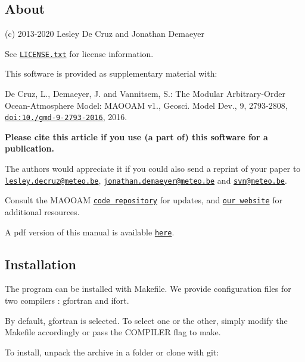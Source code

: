 \subsection*{About}

(c) 2013-\/2020 Lesley De Cruz and Jonathan Demaeyer

See \href{../../LICENSE.txt}{\tt L\+I\+C\+E\+N\+S\+E.\+txt} for license information.

This software is provided as supplementary material with\+:


\begin{DoxyItemize}
\item De Cruz, L., Demaeyer, J. and Vannitsem, S.\+: The Modular Arbitrary-\/\+Order Ocean-\/\+Atmosphere Model\+: M\+A\+O\+O\+AM v1., Geosci. Model Dev., 9, 2793-\/2808, \href{http://dx.doi.org/10.5194/gmd-9-2793-2016}{\tt doi\+:10./gmd-\/9-\/2793-\/2016}, 2016.
\end{DoxyItemize}

{\bfseries Please cite this article if you use (a part of) this software for a publication.}

The authors would appreciate it if you could also send a reprint of your paper to \href{mailto:lesley.decruz@meteo.be}{\tt lesley.\+decruz@meteo.\+be}, \href{mailto:jonathan.demaeyer@meteo.be}{\tt jonathan.\+demaeyer@meteo.\+be} and \href{mailto:svn@meteo.be}{\tt svn@meteo.\+be}.

Consult the M\+A\+O\+O\+AM \href{http://www.github.com/Climdyn/MAOOAM}{\tt code repository} for updates, and \href{http://climdyn.meteo.be}{\tt our website} for additional resources.

A pdf version of this manual is available \href{../latex/Reference_manual.pdf}{\tt here}.





\subsection*{Installation}

The program can be installed with Makefile. We provide configuration files for two compilers \+: gfortran and ifort.

By default, gfortran is selected. To select one or the other, simply modify the Makefile accordingly or pass the C\+O\+M\+P\+I\+L\+ER flag to {\ttfamily make}.

To install, unpack the archive in a folder or clone with git\+:


